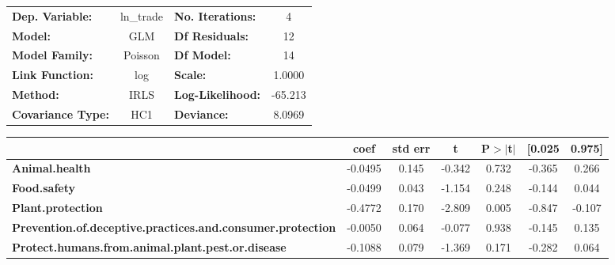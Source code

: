 \begin{center}
\begin{tabular}{lclc}
\toprule
\textbf{Dep. Variable:}                                            &   ln\_trade   & \textbf{  No. Iterations:    } &     4       \\
\textbf{Model:}                                                    &      GLM      & \textbf{  Df Residuals:      } &     12      \\
\textbf{Model Family:}                                             &    Poisson    & \textbf{  Df Model:          } &     14      \\
\textbf{Link Function:}                                            &      log      & \textbf{  Scale:             } &    1.0000   \\
\textbf{Method:}                                                   &      IRLS     & \textbf{  Log-Likelihood:    } &   -65.213   \\
\textbf{Covariance Type:}                                          &      HC1      & \textbf{  Deviance:          } &    8.0969   \\
\bottomrule
\end{tabular}
\begin{tabular}{lcccccc}
                                                                   & \textbf{coef} & \textbf{std err} & \textbf{t} & \textbf{P$> |$t$|$} & \textbf{[0.025} & \textbf{0.975]}  \\
\midrule
\textbf{Animal.health}                                             &      -0.0495  &        0.145     &    -0.342  &         0.732        &       -0.365    &        0.266     \\
\textbf{Food.safety}                                               &      -0.0499  &        0.043     &    -1.154  &         0.248        &       -0.144    &        0.044     \\
\textbf{Plant.protection}                                          &      -0.4772  &        0.170     &    -2.809  &         0.005        &       -0.847    &       -0.107     \\
\textbf{Prevention.of.deceptive.practices.and.consumer.protection} &      -0.0050  &        0.064     &    -0.077  &         0.938        &       -0.145    &        0.135     \\
\textbf{Protect.humans.from.animal.plant.pest.or.disease}          &      -0.1088  &        0.079     &    -1.369  &         0.171        &       -0.282    &        0.064     \\

\end{tabular}
\end{center}
